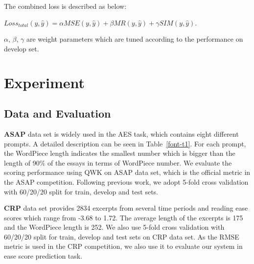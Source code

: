 \documentclass[11pt]{article}
\begin{document}
The combined loss is described as below:

$Loss_{total}(y,\hat y)=\alpha MSE(y, \hat y) + \beta MR(y, \hat y) + \gamma SIM(y, \hat y)$. 

$\alpha$, $\beta$, $\gamma$ are weight parameters which are tuned according to the performance on develop set.

\section{Experiment}

\subsection{Data and Evaluation}

\textbf{ASAP} data set is widely used in the AES task, which contains eight different prompts.
A detailed description can be seen in Table~\ref{font-t1}. For each prompt, the WordPiece length indicates the smallest number which is bigger than the length of 90\% of the essays in terms of WordPiece number.
We evaluate the scoring performance using QWK on ASAP data set, which is the official metric in the ASAP competition. Following previous work, we adopt 5-fold cross validation with 60/20/20 split for train, develop and test sets.
\begin{table}[b!]
\begin{center}
\end{center}
\caption{\label{font-t1} Statistics of ASAP data set. }
\end{table}

\textbf{CRP} data set provides 2834 excerpts from several time periods and reading ease scores which range from -3.68 to 1.72. The average length of the excerpts is 175 and the WordPiece length is 252. We also use 5-fold cross validation with 60/20/20 split for train, develop and test sets on CRP data set. As the RMSE metric is used in the CRP competition, we also use it to evaluate our system in ease score prediction task.
\end{document}

